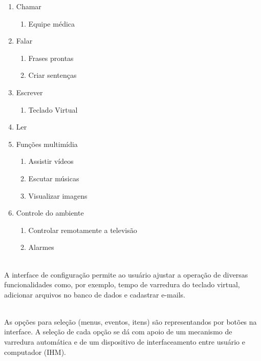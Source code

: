 \documentclass[twoside]{article}
\begin{document}
\begin{multicols}{2}
\begin{enumerate}
  \item Chamar
  \begin{enumerate}
    \item Equipe médica
  \end{enumerate}
  \item Falar
  \begin{enumerate}
    \item Frases prontas
    \item Criar sentenças
  \end{enumerate}
  \item Escrever 
    \begin{enumerate}
    \item Teclado Virtual
    \end{enumerate}
  \item Ler
  \item Funções multimídia
  \begin{enumerate}
    \item Assistir vídeos
    \item Escutar músicas
    \item Visualizar imagens
  \end{enumerate}
  \item Controle do ambiente
  \begin{enumerate}
    \item Controlar remotamente a televisão
    \item Alarmes
  \end{enumerate}
\end{enumerate}

\noindent \\A interface de configuração permite ao usuário ajustar a operação de diversas funcionalidades como, por exemplo, tempo de varredura do teclado virtual, adicionar arquivos no banco de dados e cadastrar e-mails.

\noindent \\As opções para seleção (menus, eventos, itens) são representandos por botões na interface. A seleção de cada opção se dá com apoio de um mecanismo de varredura automática e de um dispositivo de interfaceamento entre usuário e computador (IHM). 


\end{multicols}
\end{document}
